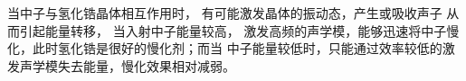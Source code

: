 当中子与氢化锆晶体相互作用时，%
有可能激发晶体的振动态，产生或吸收声子%
从而引起能量转移，%
当入射中子能量较高，%
激发高频的声学模，能够迅速将中子慢化，此时氢化锆是很好的慢化剂；而当%
中子能量较低时，只能通过效率较低的激发声学模失去能量，慢化效果相对减弱。



